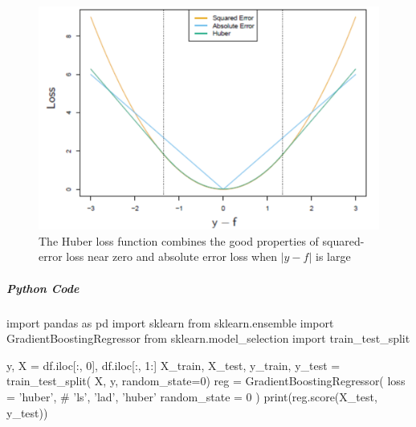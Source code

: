 \begin{figure}[H]
	\begin{center}
		\includegraphics[width=.7\textwidth]{./chap/1chap/7sec/images/3_LossFunction_reg.PNG}
	\end{center}
	\caption{The Huber loss function combines the good properties of squared-error loss near
	zero and absolute error loss when $|y-f|$ is large}
	\label{fig:3_LossFunction_reg}
\end{figure}

\subparagraph{Python Code}
\begin{python}
import pandas as pd
import sklearn
from sklearn.ensemble import GradientBoostingRegressor
from sklearn.model_selection import train_test_split

y, X = df.iloc[:, 0], df.iloc[:, 1:]
X_train, X_test, y_train, y_test = train_test_split(
    X, y, random_state=0)
reg = GradientBoostingRegressor(
   loss = 'huber', # {'ls', 'lad', 'huber'}
   random_state = 0
)
print(reg.score(X_test, y_test))
\end{python}



